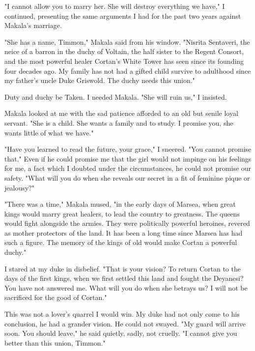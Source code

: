 \documentclass{article}
\begin{document}
"I cannot allow you to marry her. She will destroy everything we have," I continued, presenting the same arguments I had for the past two years against Makala's marriage.

"She has a name, Timmon," Makala said from his window. "Nisrita Sentaveri, the neice of a barron in the duchy of Voltain, the half sister to the Regent Consort, and the most powerful healer Cortan's White Tower has seen since its founding four decades ago. My family has not had a gifted child survive to adulthood since my father's uncle Duke Griswold. The duchy needs this union."

Duty and duchy be Taken. I needed Makala. "She will ruin us," I insisted.

Makala looked at me with the sad patience afforded to an old but senile loyal servant. "She is a child. She wants a family and to study. I promise you, she wants little of what we have."

"Have you learned to read the future, your grace," I sneered. "You cannot promise that." Even if he could promise me that the girl would not impinge on his feelings for me, a fact which I doubted under the circumstances, he could not promise our safety. "What will you do when she reveals our secret in a fit of feminine pique or jealousy?"

"There was a time," Makala mused, "in the early days of Marsea, when great kings would marry great healers, to lead the country to greatness. The queens would fight alongside the armies. They were politically powerful heroines, revered as mother protectors of the land. It has been a long time since Marsea has had such a figure. The memory of the kings of old would make Cortan a powerful duchy."

I stared at my duke in disbelief. "That is your vision? To return Cortan to the days of the first kings, when we first settled this land and fought the Deyanesi? You have not answered me. What will you do when she betrays us? I will not be sacrificed for the good of Cortan."

This was not a lover's quarrel I would win. My duke had not only come to his conclusion, he had a grander vision. He could not swayed. "My guard will arrive soon. You should leave," he said quietly, sadly, not cruelly. "I cannot give you better than this union, Timmon."
\end{document}
